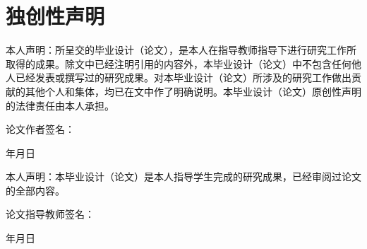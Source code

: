 \clearpage
\chapter*{独创性声明}
\thispagestyle{empty}

本人声明：所呈交的毕业设计（论文），是本人在指导教师指导下进行研究工作所取得的成果。除文中已经注明引用的内容外，本毕业设计（论文）中不包含任何他人已经发表或撰写过的研究成果。对本毕业设计（论文）所涉及的研究工作做出贡献的其他个人和集体，均已在文中作了明确说明。本毕业设计（论文）原创性声明的法律责任由本人承担。

\vspace{2cm}
\noindent 论文作者签名：\hspace{4cm}

\vspace{1cm}
\noindent 年\hspace{1cm}月\hspace{1cm}日

\vspace{2.2cm}
本人声明：本毕业设计（论文）是本人指导学生完成的研究成果，已经审阅过论文的全部内容。

\vspace{2cm}
\noindent 论文指导教师签名：\hspace{3.2cm}

\vspace{1cm}
\noindent 年\hspace{1cm}月\hspace{1cm}日
\clearpage
